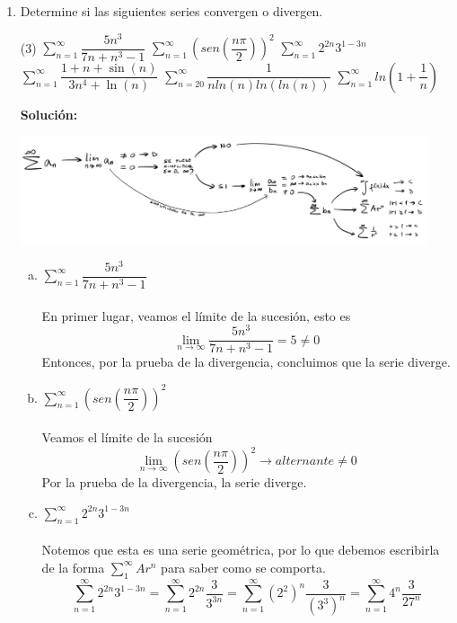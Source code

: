\documentclass[12pt]{article}
\newenvironment{solucion}
{\begin{mdframed}[backgroundcolor=black!10]
		{\bf Solución:}\\
	}
	{
	\end{mdframed}
}
\newenvironment{preguntas}
{\begin{enumerate}\itemsep12pt
	}
	{
	\end{enumerate}
}
\newcommand{\ra}{\rightarrow}
\begin{document}
\begin{preguntas}
\begin{solucion}
\end{solucion}
\item Determine si las siguientes series convergen o divergen.
\begin{tasks}(3)
\task $\sum\limits_{n=1}^{\infty}\dfrac{5n^3}{7n+n^3-1}$
\task $\sum\limits_{n=1}^{\infty}\left(sen\left(\dfrac{n\pi}{2}\right)\right)^2$
\task $\sum\limits_{n=1}^{\infty}2^{2n}3^{1-3n}$
\task $\sum\limits_{n=1}^{\infty}\dfrac{1 + n + \sin(n)}{3n^4 + \ln(n)}$
\task $\sum\limits_{n=20}^{\infty}\dfrac{1}{nln(n)ln(ln(n))}$
\task $\sum\limits_{n=1}^{\infty}ln\left(1+\dfrac{1}{n}\right)$
\end{tasks}
\begin{solucion}
\begin{center}
\includegraphics[width=12cm]{../../../../img/mapa_series}
\end{center}
\begin{enumerate}[a)]
\item $\sum\limits_{n=1}^{\infty}\dfrac{5n^3}{7n+n^3-1}$\\
			\\
			En primer lugar, veamos el límite de la sucesión, esto es
			$$\lim\limits_{n\ra \infty} \dfrac{5n^3}{7n+n^3-1} = 5 \neq 0$$
			Entonces, por la prueba de la divergencia, concluimos que la serie diverge.
\item $\sum\limits_{n=1}^{\infty}\left(sen\left(\dfrac{n\pi}{2}\right)\right)^2$\\
			\\
			Veamos el límite de la sucesión
			$$\lim\limits_{n\ra \infty} \left(sen\left(\dfrac{n\pi}{2}\right)\right)^2 \ra alternante \neq 0$$
			Por la prueba de la divergencia, la serie diverge.
\item $\sum\limits_{n=1}^{\infty}2^{2n}3^{1-3n}$\\
			\\
			Notemos que esta es una serie geométrica, por lo que debemos escribirla de la forma $\sum\limits_1^{\infty} Ar^n$ para saber como se comporta.
$$\sum\limits_{n=1}^{\infty}2^{2n}3^{1-3n} 
= \sum\limits_{n=1}^{\infty}2^{2n} \dfrac{3}{3^{3n}}
= \sum\limits_{n=1}^{\infty}(2^2)^n \dfrac{3}{(3^3)^n}
= \sum\limits_{n=1}^{\infty}4^n \dfrac{3}{27^n}
$$
\end{enumerate}
\end{solucion}
\end{preguntas}
\end{document}

